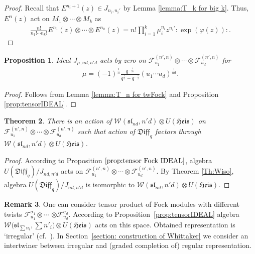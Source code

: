 \documentclass[pdftex]{sigma}
\numberwithin{equation}{section}
\newtheorem{Theorem}{Theorem}[section]
\newtheorem{Proposition}[Theorem]{Proposition}
\theoremstyle{definition}
\newtheorem{Remark}[Theorem]{Remark}
\newcommand{\half}{\frac{1}{2}}
\newcommand{\qD}{\mathfrak{Diff}_q}
\newcommand{\UH}{\otimes U(\mathfrak{Heis})}
\newcommand{\WHnd}{\mathcal{W}(\mathfrak{sl}_{nd}, n'd) \UH}
\begin{document}
\begin{proof}
Recall that $E^{n_i+1}(z) \in J_{n_i, n_i'}$ by Lemma \ref{lemma:T_k for big k}. Thus, $E^n(z)$ act on $M_1 \otimes \cdots \otimes M_k$ as
\begin{gather*}
\frac{n!}{n_1! \cdots n_k!} E^{n_1}(z) \otimes \cdots \otimes E^{n_k}(z) = n! \prod_{i=1}^k \mu_i^{n_i} z^{n_i'} : \! \exp(\varphi(z)) \! :.\tag*{\qed}
\end{gather*}\renewcommand{\qed}{}
\end{proof}

\begin{Proposition} \label{prop:tensor Fock IDEAL}
Ideal $J_{\mu, nd, n'd}$ acts by zero on $\mathcal{F}^{(n',n)}_{u_1} \otimes \cdots \otimes \mathcal{F}_{u_d}^{(n',n)}$ for
\begin{gather}
\mu = (-1)^{\frac{1}{n}} \frac{q^{-\frac{1}{2n}}}{q^{\half}-q^{-\half}} (u_1 \cdots u_d)^{\frac{1}{nd}} .\label{eq:mu tensor Fock}
\end{gather}
\end{Proposition}
\begin{proof}
Follows from Lemma \ref{lemma:T_n for twFock} and Proposition \ref{prop:tensorIDEAL}.
\end{proof}

\begin{Theorem} \label{Theorem:twFocktwW}
There is an action of $\WHnd$ on $\mathcal{F}^{(n',n)}_{u_1} \otimes \cdots \otimes \mathcal{F}_{u_d}^{(n',n)}$ such that action of $\qD$ factors through $\WHnd$.
\end{Theorem}
\begin{proof}
According to Proposition $\ref{prop:tensor Fock IDEAL}$, algebra $U(\qD)/J_{nd,n'd}$ acts on $\mathcal{F}^{(n',n)}_{u_1} \otimes \cdots \otimes \mathcal{F}_{u_d}^{(n',n)}$. By Theorem \ref{Th:Wiso}, algebra $U(\qD)/J_{nd,n'd}$ is isomorphic to $\WHnd$.
\end{proof}
\begin{Remark}
One can consider tensor product of Fock modules with different twists $\mathcal{F}^{\sigma_1}_{u_1} \otimes \cdots$ $\otimes \mathcal{F}_{u_d}^{\sigma_d}$. According to Proposition~\ref{prop:tensorIDEAL} algebra $\mathcal{W}\big(\mathfrak{sl}_{\sum n_i}, \sum n'_i\big) \UH$ acts on this space. Obtained representation is `irregular' (cf.~\cite{Na15}). In Section~\ref{section: construction of Whittaker} we consider an intertwiner between irregular and (graded completion of) regular representation.
\end{Remark}
\end{document}
